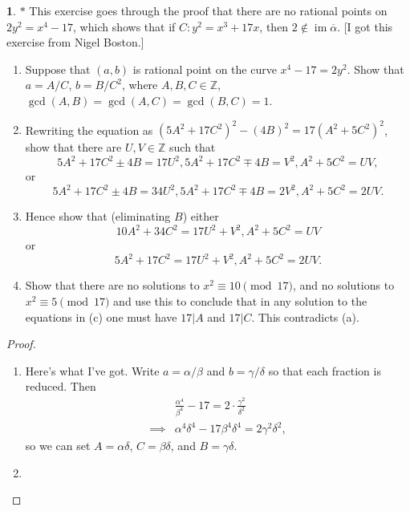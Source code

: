 \documentclass[12pt]{article}
\newcommand{\Z}{\mathbb{Z}}
\DeclareMathOperator{\im}{im}
\theoremstyle{definition}
\newtheorem{ex}{}
\begin{document}
\begin{ex}
	$*$ This exercise goes through the proof that there are no rational points
	on $2y^{2} = x^{4} - 17$, which shows that if $C : y^{2} = x^{3} + 17x$,
	then $2 \not\in \im \overline{\alpha}$. [I got this exercise from Nigel Boston.]

	\begin{enumerate}[label=(\alph*)]
		\item Suppose that $(a,b)$ is rational point on the curve $x^{4}
			      - 17 = 2y^{2}$. Show that $a = A/C$, $b = B/C^{2}$, where $A, B, C \in \Z$,
		      $\gcd(A,B) = \gcd(A,C) = \gcd(B,C) = 1$.

		\item Rewriting the equation as $(5A^{2} + 17C^{2})^{2} - (4B)^{2} =
			      17(A^{2} + 5C^{2})^{2}$, show that there are $U,V \in \Z$ such that
		      \[
			      5A^{2} + 17C^{2} \pm 4B = 17U^{2}, 5A^{2} + 17C^{2} \mp 4B = V^{2},
			      A^{2} + 5C^{2} = UV,
		      \]
		      or
		      \[
			      5A^{2} + 17C^{2} \pm 4B = 34U^{2}, 5A^{2} + 17C^{2} \mp 4B = 2V^{2},
			      A^{2} + 5C^{2} = 2UV.
		      \]

		\item Hence show that (eliminating $B$) either
		      \[
			      10A^{2} + 34C^{2} = 17U^{2} + V^{2}, A^{2} + 5C^{2} = UV
		      \]
		      or
		      \[
			      5A^{2} + 17C^{2} = 17U^{2} + V^{2}, A^{2} + 5C^{2} = 2UV.
		      \]

		\item Show that there are no solutions to $x^{2} \equiv 10 \pmod{17}$,
		      and no solutions to $x^{2} \equiv 5 \pmod{17}$ and use this to conclude
		      that in any solution to the equations in (c) one must have $17 | A$ and $17 | C$. This contradicts (a).
	\end{enumerate}
\end{ex}
\begin{proof}\
	\begin{enumerate}[label=(\alph*)]
		\item Here's what I've got.
		      Write $a = \alpha/\beta$ and $b = \gamma/\delta$ so that each fraction is reduced.
		      Then \begin{align*}
			               & \frac{\alpha^4}{\beta^4} - 17 = 2\cdot \frac{\gamma^2}{\delta^2} \\
			      \implies & \alpha^4\delta^4 - 17\beta^4\delta^4 = 2\gamma^2\delta^2,
		      \end{align*}
          so we can set $A = \alpha\delta$, $C = \beta\delta$, and $B = \gamma\delta$.
        \item 
	\end{enumerate}
\end{proof}
\end{document}
